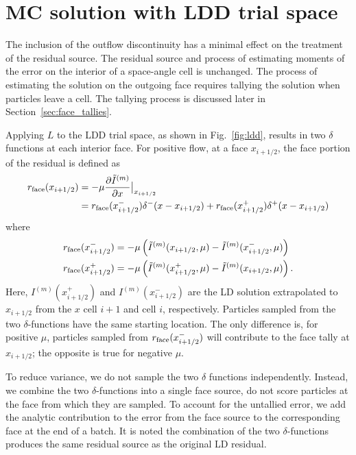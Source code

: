 \section{MC solution with LDD trial space}
\label{sec:ldd_mc}

The inclusion of the outflow discontinuity has a minimal effect on the treatment of the
residual source. The residual source and process of estimating moments of
the error on the interior of a space-angle cell is unchanged.  The process of estimating
the solution on the outgoing face requires tallying the solution when particles leave a
cell. The tallying process is discussed later in Section~\ref{sec:face_tallies}.  

Applying $L$ to the LDD trial space, as shown in Fig.~\ref{fig:ldd}, results in two $\delta$ functions at each interior face.
For positive flow, at a face $x_{i+1/2}$, the face portion of the residual is defined as
\begin{align}
    \label{eq:res_face}
    r_{\text{face}}(x_{i+1/2}) &= -\mu \frac{\partial \tilde I^{(m)}}{\partial x}\big|_{x_{i+1/2}}\\
    &= r_{\text{face}}(x_{i+1/2}^-)\delta^-(x - x_{i+1/2}) + r_{\text{face}}(x_{i+1/2}^+)\delta^+(x - x_{i+1/2}) 
\end{align}
where
\begin{align}
    r_{\text{face}}(x_{i+1/2}^-) &= -\mu\left( \tilde I^{(m)}(x_{i+1/2},\mu) - \tilde I^{(m)}(x_{i+1/2}^-,\mu)
           \right)\\
    r_{\text{face}}(x_{i+1/2}^+) &= -\mu\left( \tilde I^{(m)}(x_{i+1/2}^+,\mu) -
           \tilde I^{(m)}(x_{i+1/2},\mu)
           \right).
\end{align}
Here, $I^{(m)}(x_{i+1/2}^+)$ and $I^{(m)}(x_{i+1/2}^-)$ are the LD solution extrapolated to $x_{i+1/2}$ from the
$x$ cell $i+1$ and cell $i$, respectively.
Particles sampled from the two $\delta$-functions have the same starting location.  The
only difference is, for positive $\mu$,  particles sampled from $r_{\text{face}}(x^-_{i+1/2})$ will
contribute to the face tally at $x_{i+1/2}$; the opposite is true for negative $\mu$.

To reduce variance, we do not sample the two $\delta$ functions independently.
Instead, we combine the
two $\delta$-functions into a single face source,
do not score particles at the face from which they are sampled.  To account for the
untallied error, we add the analytic
contribution to the error from the face source to the corresponding face at the end of a batch.
It is noted the combination of the two $\delta$-functions produces the same residual source as the
original LD residual.

